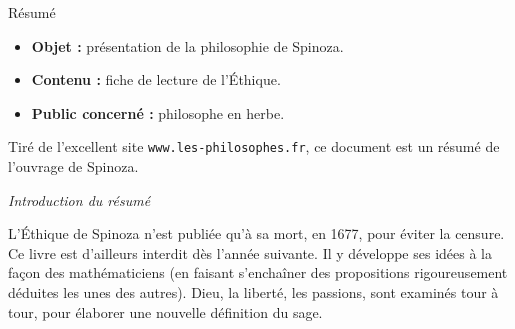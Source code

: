 \begin{center}
\Large
Résumé
\normalsize
\end{center}
\vspace{3cm}
\begin{itemize}[leftmargin=1cm, label=, itemsep=21pt]
\item {\bf Objet : } présentation de la philosophie de Spinoza.
\item {\bf Contenu : } fiche de lecture de l'Éthique.
\item {\bf Public concerné : } philosophe en herbe.
\end{itemize}

\vspace{3cm}


Tiré de l'excellent site \texttt{www.les-philosophes.fr}, ce document est un résumé de l'ouvrage de Spinoza.


\vspace{0.5cm}
{ \it Introduction du résumé}

\vspace{0.5cm}
L’Éthique de Spinoza n’est publiée qu’à sa mort, en 1677, pour éviter la censure. Ce livre est d’ailleurs interdit dès l’année suivante. Il y développe ses idées à la façon des mathématiciens (en faisant s’enchaîner des propositions rigoureusement déduites les unes des autres). Dieu, la liberté, les passions, sont examinés tour à tour, pour élaborer une nouvelle définition du sage.

\vspace{3cm}

